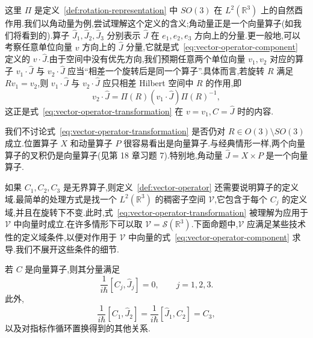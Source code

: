 这里 $\Pi$ 是定义~\ref{def:rotation-representation} 中 $SO(3)$ 在 $L^2(\mathbb R^3)$ 上的自然酉作用.我们以角动量为例,尝试理解这个定义的含义;角动量正是一个向量算子(如我们将看到的).算子 $\widehat J_1,\widehat J_2,\widehat J_3$ 分别表示 $\widehat J$ 在 $e_1,e_2,e_3$ 方向上的分量.更一般地,可以考察任意单位向量 $v$ 方向上的 $\widehat J$ 分量,它就是式~\eqref{eq:vector-operator-component} 定义的 $v\cdot\widehat J$.由于空间中没有优先方向,我们预期任意两个单位向量 $v_1,v_2$ 对应的算子 $v_1\cdot\widehat J$ 与 $v_2\cdot\widehat J$ 应当“相差一个旋转后是同一个算子”.具体而言,若旋转 $R$ 满足 $Rv_1=v_2$,则 $v_1\cdot\widehat J$ 与 $v_2\cdot\widehat J$ 应只相差 Hilbert 空间中 $R$ 的作用,即
\[
 v_2\cdot\widehat J=\Pi(R)(v_1\cdot\widehat J)\Pi(R)^{-1},
\]
这正是式~\eqref{eq:vector-operator-transformation} 在 $v=v_1,C=\widehat J$ 时的内容.

我们不讨论式~\eqref{eq:vector-operator-transformation} 是否仍对 $R\in O(3)\setminus SO(3)$ 成立.位置算子 $X$ 和动量算子 $P$ 很容易看出是向量算子.与经典情形一样,两个向量算子的叉积仍是向量算子(见第 18 章习题 7).特别地,角动量 $\widehat J=X\times P$ 是一个向量算子.

如果 $C_1,C_2,C_3$ 是无界算子,则定义~\ref{def:vector-operator} 还需要说明算子的定义域.最简单的处理方式是找一个 $L^2(\mathbb R^3)$ 的稠密子空间 $\mathcal V$,它包含于每个 $C_j$ 的定义域,并且在旋转下不变.此时,式~\eqref{eq:vector-operator-transformation} 被理解为应用于 $\mathcal V$ 中向量时成立.在许多情形下可以取 $\mathcal V=\mathcal S(\mathbb R^3)$.下面命题中,$\mathcal V$ 应满足某些技术性的定义域条件,以便对作用于 $\mathcal V$ 中向量的式~\eqref{eq:vector-operator-component} 求导.我们不展开这些条件的细节.

\begin{proposition}[向量算子的交换关系]\label{prop:vector-operator-commutators}
若 $C$ 是向量算子,则其分量满足
\[
 \frac1{i\hbar}[C_j,\widehat J_j]=0,\qquad j=1,2,3.
\label{eq:vector-operator-diagonal-commutator}
\]
此外,
\[
 \frac1{i\hbar}[C_1,\widehat J_2]=\frac1{i\hbar}[\widehat J_1,C_2]=C_3,
\label{eq:vector-operator-cyclic-commutator}
\]
以及对指标作循环置换得到的其他关系.
\end{proposition}

